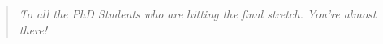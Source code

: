 \vspace*{\fill}
\begin{quote}
  \raggedleft
  \textit{To all the PhD Students who are hitting the final stretch. You're almost there!}
\end{quote}
\vspace*{\fill}
